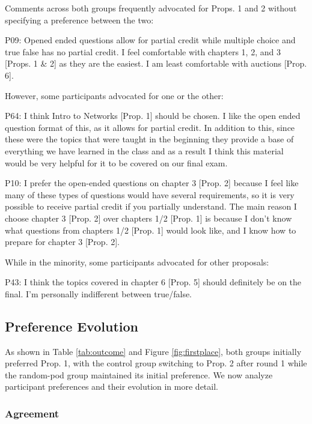 {Comments across both groups frequently advocated for Props. 1 and 2 without specifying a preference between the two:
\begin{displayquote}
P09: Opened ended questions allow for partial credit while multiple choice and true false has no partial credit. I feel comfortable with chapters 1, 2, and 3 [Props. 1 \& 2] as they are the easiest. I am least comfortable with auctions [Prop. 6].
\end{displayquote}
However, some participants advocated for one or the other:
\begin{displayquote}
P64: I think Intro to Networks [Prop. 1] should be chosen. I like the open ended question format of this, as it allows for partial credit. In addition to this, since these were the topics that were taught in the beginning they provide a base of everything we have learned in the class and as a result I think this material would be very helpful for it to be covered on our final exam.
\end{displayquote}
\begin{displayquote}
P10: I prefer the open-ended questions on chapter 3 [Prop. 2] because I feel like many of these types of questions would have several requirements, so it is very possible to receive partial credit if you partially understand. The main reason I choose chapter 3 [Prop. 2] over chapters 1/2 [Prop. 1] is because I don't know what questions from chapters 1/2 [Prop. 1] would look like, and I know how to prepare for chapter 3 [Prop. 2].
\end{displayquote}
While in the minority, some participants advocated for other proposals:
\begin{displayquote}
P43: I think the topics covered in chapter 6 [Prop. 5] should definitely be on the final. I'm personally indifferent between true/false.
\end{displayquote}


\subsection{Preference Evolution}

As shown in Table \ref{tab:outcome} and Figure \ref{fig:firstplace}, both groups initially preferred Prop. 1, with the control group switching to Prop. 2 after round 1 while the random-pod group maintained its initial preference.
We now analyze participant preferences and their evolution in more detail.

\subsubsection{Agreement}
\label{sec:res-agreement}

}
